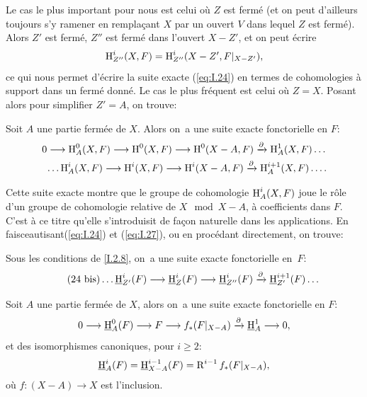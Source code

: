Le cas le plus important pour nous est celui o\`u $Z$ est ferm\'e (et
on peut d'ailleurs toujours s'y ramener en rempla\c cant $X$ par
un ouvert $V$ dans lequel $Z$ est ferm\'e). Alors $Z'$ est ferm\'e,
$Z''$ est ferm\'e dans l'ouvert $X-Z'$, et on peut \'ecrire
\begin{equation} \label{eq:I.26} {\operatorname{H}^i_{Z''}(X, F)=\operatorname{H}^i_{Z''}(X-Z', F|_{X-Z'})},
\end{equation}
ce qui nous permet d'\'ecrire la suite exacte (\ref{eq:I.24}) en termes de cohomologies \`a support dans un ferm\'e donn\'e. Le cas le plus fr\'equent est celui o\`u $Z=X$. Posant alors pour simplifier $Z'=A$, on trouve:

\begin{corollaire} \label{I.2.9}
Soit $A$ une partie ferm\'ee de $X$. Alors on~a une suite exacte fonctorielle en $F$:
\begin{equation} \label{eq:I.27}
\begin{gathered}
0 \to \H^0_A(X, F) \to \H^0(X, F) \to \H^0(X-A, F) \lto{\partial} \H^1_A(X, F) \dots\\
\phantom{0}\dots \H^i_A(X, F) \to \H^i(X, F) \to \H^i(X-A, F) \lto{\partial} \H^{i+1}_A(X, F)\dots.
\end{gathered}
\end{equation}
\end{corollaire}

Cette suite exacte montre que le groupe de cohomologie $\operatorname{H}^i_A(X,
F)$ joue le r\^{o}le d'un groupe de cohomologie relative de $X\mod
X-A$, \`a coefficients dans $F$. C'est \`a ce titre qu'elle
s'introduisit de fa\c con naturelle dans les applications. En \og
faisceautisant\fg (\ref{eq:I.24}) et (\ref{eq:I.27}), ou en
proc\'edant directement, on trouve:

\begin{corollaire} \label{I.2.10}
Sous les conditions de \ref{I.2.8}, on~a une suite exacte fonctorielle en~$F$:
\begin{equation*} \label{eq:I.24bis} \tag{24 bis}
\dots \mathop{\underline{\mathrm{H}}}\nolimits^i_{Z'}(F) \to \mathop{\underline{\mathrm{H}}}\nolimits^i_{Z}(F) \to \mathop{\underline{\mathrm{H}}}\nolimits_{Z''}^i(F) \lto{\partial} \mathop{\underline{\mathrm{H}}}\nolimits_{Z'}^{i+1}(F) \dots
\end{equation*}
\end{corollaire}

\begin{corollaire} \label{I.2.11}
Soit $A$ une partie ferm\'ee de $X$, alors on~a une suite exacte fonctorielle en $F$:
\begin{equation} \label{eq:I.28}
0 \to \mathop{\underline{\mathrm{H}}}\nolimits_A^0(F) \to F \to f_*(F|_{X-A}) \lto{\partial} \mathop{\underline{\mathrm{H}}}\nolimits_A^1 \to 0,
\end{equation}
et des isomorphismes canoniques, pour $i\geq 2$:
\begin{equation} \label{eq:I.29}
\mathop{\underline{\mathrm{H}}}\nolimits_A^i(F)= \mathop{\underline{\mathrm{H}}}\nolimits_{X-A}^{i-1}(F)=\operatorname{R}^{i-1}f_*(F|_{X-A}),
\end{equation}
o\`u $f: (X-A) \to X$ est l'inclusion.
\end{corollaire}

